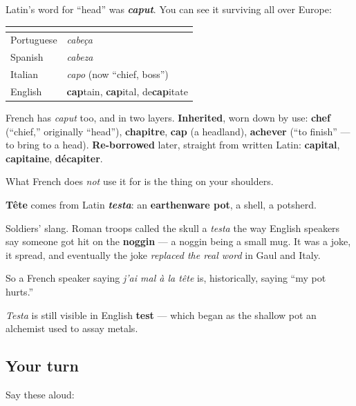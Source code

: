 \begin{cousinweb}
Latin's word for \textquotedblleft{}head\textquotedblright{} was \emph{\textbf{caput}}. You can see it surviving all over Europe:

\noindent
\begin{tabularx}{\linewidth}{@{}>{\raggedright\arraybackslash}X>{\raggedright\arraybackslash}X@{}}
\toprule
\textbf{} & \textbf{} \\
\midrule
Portuguese & \emph{cabeça} \\
Spanish & \emph{cabeza} \\
Italian & \emph{capo} (now \textquotedblleft{}chief, boss\textquotedblright{}) \\
English & \textbf{cap}tain, \textbf{cap}ital, de\textbf{cap}itate \\
\bottomrule
\end{tabularx}

French has \emph{caput} too, and in two layers. \textbf{Inherited}, worn down by use: \textbf{chef} (\textquotedblleft{}chief,\textquotedblright{} originally \textquotedblleft{}head\textquotedblright{}), \textbf{chapitre}, \textbf{cap} (a headland), \textbf{achever} (\textquotedblleft{}to finish\textquotedblright{} — to bring to a head). \textbf{Re-borrowed} later, straight from written Latin: \textbf{capital}, \textbf{capitaine}, \textbf{décapiter}.

What French does \emph{not} use it for is the thing on your shoulders.

\textbf{Tête} comes from Latin \emph{\textbf{testa}}: an \textbf{earthenware pot}, a shell, a potsherd.
\end{cousinweb}

\begin{culture}
Soldiers' slang. Roman troops called the skull a \emph{testa} the way English speakers say someone got hit on the \textbf{noggin} — a noggin being a small mug. It was a joke, it spread, and eventually the joke \emph{replaced the real word} in Gaul and Italy.

So a French speaker saying \emph{j'ai mal à la tête} is, historically, saying \textquotedblleft{}my pot hurts.\textquotedblright{}

\emph{Testa} is still visible in English \textbf{test} — which began as the shallow pot an alchemist used to assay metals.
\end{culture}

\subsection*{Your turn}
Say these aloud:

